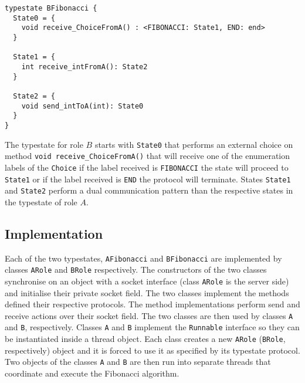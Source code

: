 \begin{lstlisting}[caption={Typestate for Role A}]
typestate BFibonacci {
  State0 = {
    void receive_ChoiceFromA() : <FIBONACCI: State1, END: end>
  }

  State1 = {
    int receive_intFromA(): State2
  }

  State2 = {
    void send_intToA(int): State0
  }
}
\end{lstlisting}

The typestate for role $B$ starts with \lstinline|State0|
that performs an external choice on method
\lstinline|void receive_ChoiceFromA()| that will receive
one of the enumeration labels of the \lstinline|Choice|
if the label received is \lstinline|FIBONACCI| the state
will proceed to \lstinline|State1| or if the label
received is \lstinline|END| the protocol will terminate.
States \lstinline|State1| and \lstinline|State2| perform
a dual communication pattern than the respective states
in the typestate of role $A$.


\subsection{\Mungo Implementation}

Each of the two typestates, \lstinline|AFibonacci| and
\lstinline|BFibonacci| are implemented by classes
\lstinline|ARole| and \lstinline|BRole| respectively.
The constructors of the two classes synchronise
on an object with a socket interface (class \lstinline|ARole|
is the server side) and initialise their private socket
field.
The two classes implement
the methods defined their respective protocols. The
method implementations perform send and receive actions
over their socket field. The two classes are then
used by classes \lstinline|A| and \lstinline|B|, respectively.
Classes \lstinline|A| and \lstinline|B| implement the \lstinline|Runnable|
interface so they can be instantiated inside a thread object.
Each class creates a new \lstinline|ARole| (\lstinline|BRole|, respectively)
object and it is forced to use it as specified by its typestate
protocol.
Two objects of the classes \lstinline|A| and \lstinline|B| are
then run into separate threads that coordinate and execute the
Fibonacci algorithm.

\begin{comment}
We could refine the automated code to be more readable:
\begin{lstlisting}
typestate AFibonacci {
  Fibonacci = {
    void send_fibonacciToB() : PingPong,
    void send_endToB() : end,
  }

  PingPong	=	{
    void send_intToB(int): { 
      int receive_intFromB(): Fibonacci
    }
  }
}
\end{lstlisting}

\begin{lstlisting}
typestate BFibonacci {
  Fibonacci = {
    void receive_ChoiceFromA() : <FIBONACCI: PingPong, END: end>
  }

  PingPong = {
    int receive_intFromA(): {
      void send_intToA(int): State0
    }
  }
}
\end{lstlisting}
\end{comment}

